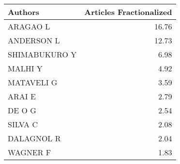 
\begin{tabular}{lr}
\toprule
Authors & Articles Fractionalized\\
\midrule
ARAGAO L & 16.76\\
ANDERSON L & 12.73\\
SHIMABUKURO Y & 6.98\\
MALHI Y & 4.92\\
MATAVELI G & 3.59\\
\addlinespace
ARAI E & 2.79\\
DE O G & 2.54\\
SILVA C & 2.08\\
DALAGNOL R & 2.04\\
WAGNER F & 1.83\\
\bottomrule
\end{tabular}